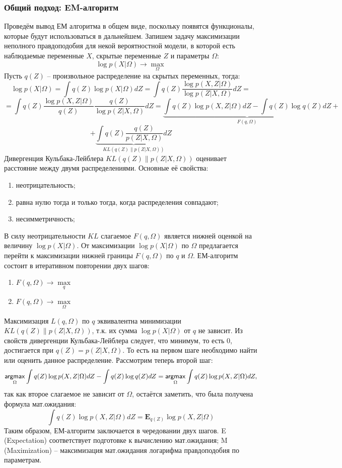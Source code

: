 \documentclass[12pt]{article}
\newcommand{\argmax}{\mathop{\mathsf{argmax}}\limits}
\begin{document}
	\subsubsection{Общий подход: EM-алгоритм}
	Проведём вывод ЕМ алгоритма в общем виде, поскольку появятся функционалы, которые будут использоваться в дальнейшем. Запишем задачу максимизации неполного правдоподобия для некой вероятностной модели, в которой есть наблюдаемые переменные $X$, скрытые переменные $Z$ и параметры $\Omega$:
\[
\log p(X|\Omega) \to \max\limits_{\Omega}
\]
 Пусть $q(Z)$ -- произвольное распределение на скрытых переменных, тогда:
\[
\log p(X|\Omega) = \int q(Z) \log p(X|\Omega) dZ = \int q(Z) \frac{\log p(X, Z|\Omega)}{\log p(Z|X,\Omega)} dZ = 
\]
\[
=  \int q(Z) \frac{\log p(X, Z|\Omega)}{q(Z)} \frac{q(Z)}{\log p(Z|X,\Omega)} dZ =  \underbrace{  \int q(Z) \log p(X, Z|\Omega) dZ  - \int q(Z) \log q(Z) dZ }_{F(q, \Omega)} +
\]
\[
+  \underbrace{  \int q(Z) \frac{q(Z)}{p(Z|X,\Omega)} dZ }_{KL(q(Z)\|p(Z|X,\Omega))}
\]
Дивергенция Кульбака-Лейблера $KL(q(Z)\|p(Z|X,\Omega))$ оценивает расстояние между двумя распределениями. Основные её свойства:
\begin{enumerate}
\item неотрицательность;
\item равна нулю тогда и только тогда, когда распределения совпадают;
\item несимметричность;
\end{enumerate}
В силу неотрицательности $KL$ слагаемое $F(q, \Omega)$ является нижней оценкой на величину $\log p(X|\Omega)$. От максимизации $\log p(X|\Omega)$ по $\Omega$ предлагается перейти к максимизации нижней границы $F(q, \Omega)$ по $q$ и $\Omega$. ЕМ-алгоритм состоит в итеративном повторении двух шагов:
\begin{enumerate}
\item $F(q, \Omega) \to \max\limits_q$
\item $F(q, \Omega) \to \max\limits_{\Omega}$
\end{enumerate}
Максимизация $L(q, \Omega)$ по $q$ эквивалентна минимизации $KL(q(Z)\|p(Z|X,\Omega))$, т.к. их сумма $\log p(X|\Omega)$ от $q$ не зависит. Из свойств дивергенции Кульбака-Лейблера следует, что минимум, то есть $0$, достигается при $q(Z) = p(Z|X,\Omega)$. То есть на первом шаге необходимо найти или оценить данное распределение. Рассмотрим теперь второй шаг:
\[
\argmax\limits_{\Omega} \int q(Z) \log p(X, Z|\Omega) dZ  - \int q(Z) \log q(Z) dZ  =\argmax\limits_{\Omega}  \int q(Z) \log p(X, Z|\Omega) dZ ,
\]
так как второе слагаемое не зависит от $\Omega$, остаётся заметить, что была получена формула мат.ожидания:
\[
 \int q(Z) \log p(X, Z|\Omega) dZ = \mathbf{E}_{q(Z)} \log p(X, Z|\Omega)
\]
Таким образом, ЕМ-алгоритм заключается в чередовании двух шагов. E (Expectation) соответствует подготовке к вычислению мат.ожидания; M (Maximization) -- максимизация мат.ожидания логарифма правдоподобия по параметрам.
\end{document}

